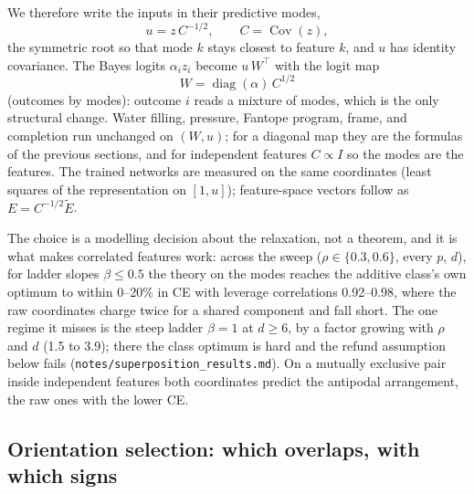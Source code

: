 We therefore write the inputs in their predictive modes,
\begin{equation}
u = z\,C^{-1/2},\qquad C=\operatorname{Cov}(z),
\label{eq:modes}
\end{equation}
the symmetric root so that mode \(k\) stays closest to feature \(k\), and \(u\) has
identity covariance. The Bayes logits \(\alpha_i z_i\) become \(u\,W^\top\) with the
logit map
\begin{equation}
W=\operatorname{diag}(\alpha)\,C^{1/2}
\label{eq:mode-map}
\end{equation}
(outcomes by modes): outcome \(i\) reads a mixture of modes, which is the only
structural change. Water filling, pressure, Fantope program, frame, and completion
run unchanged on \((W, u)\); for a diagonal map they are the formulas of the previous
sections, and for independent features \(C\propto I\) so the modes are the features.
The trained networks are measured on the same coordinates (least squares of the
representation on \([1, u]\)); feature-space vectors follow as \(E = C^{-1/2}\tilde E\).

The choice is a modelling decision about the relaxation, not a theorem, and it is
what makes correlated features work: across the sweep (\(\rho\in\{0.3,0.6\}\), every
\(p\), \(d\)), for ladder slopes \(\beta\le 0.5\) the theory on the modes reaches the additive
class's own optimum to within 0--20\% in CE with leverage correlations 0.92--0.98, where
the raw coordinates charge twice for a shared component and fall short. The one regime it
misses is the steep ladder \(\beta=1\) at \(d\ge 6\), by a factor growing with \(\rho\) and \(d\)
(1.5 to 3.9); there the class optimum is hard and the refund assumption below fails
(\texttt{notes/superposition\_results.md}). On a mutually exclusive pair inside independent
features both coordinates predict the antipodal arrangement, the raw ones with the lower CE.

\subsection{Orientation selection: which overlaps, with which signs}
\label{sec:orientation}

